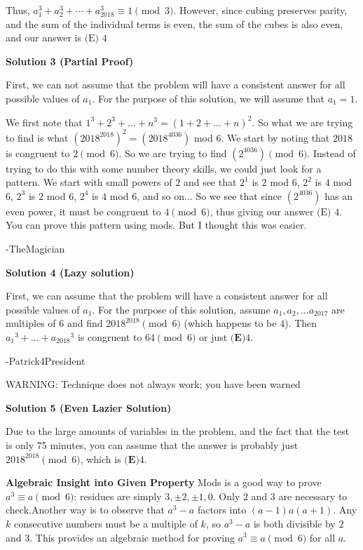 \begin{enumerate}
 Thus, $a_1^3+a_2^3+\cdots+a_{2018}^3\equiv 1\pmod 3$. However, since cubing preserves parity, and the sum of the individual terms is even, the sum of the cubes is also even, and our answer is $\boxed{\text{(E) }4}$




\textbf{Solution 3 (Partial Proof)}

First, we can not assume that the problem will have a consistent answer for all possible values of $a_1$. For the purpose of this solution, we will assume that $a_1 = 1$.

 We first note that $1^3+2^3+...+n^3 = (1+2+...+n)^2$. So what we are trying to find is what $\left(2018^{2018}\right)^2=\left(2018^{4036}\right)$ mod $6$. We start by noting that $2018$ is congruent to $2 \pmod{6}$. So we are trying to find $\left(2^{4036}\right) \pmod{6}$. Instead of trying to do this with some number theory skills, we could just look for a pattern. We start with small powers of $2$ and see that $2^1$ is $2$ mod $6$, $2^2$ is $4$ mod $6$, $2^3$ is $2$ mod $6$, $2^4$ is $4$ mod $6$, and so on... So we see that since $\left(2^{4036}\right)$ has an even power, it must be congruent to $4 \pmod{6}$, thus giving our answer $\boxed{\text{(E) }4}$. You can prove this pattern using mods. But I thought this was easier.

 -TheMagician

 



\textbf{Solution 4 (Lazy solution)}

First, we can assume that the problem will have a consistent answer for all possible values of $a_1$. For the purpose of this solution, assume $a_1, a_2, ... a_{2017}$ are multiples of 6 and find $2018^{2018} \pmod{6}$ (which happens to be $4$). Then ${a_1}^3 + ... + {a_{2018}}^3$ is congruent to $64 \pmod{6}$ or just $\boxed{\textbf{(E)}  4}$. 

 -Patrick4President

 WARNING: Technique does not always work; you have been warned

 



\textbf{Solution 5 (Even Lazier Solution)}

Due to the large amounts of variables in the problem, and the fact that the test is only 75 minutes, you can assume that the answer is probably just $2018^{2018} \pmod{6}$, which is $\boxed{\textbf{(E)}  4}$.

 \textbf{Algebraic Insight into Given Property} Mods is a good way to prove $a^3 \equiv a \pmod6$: residues are simply $3, \pm 2, \pm 1, 0$. Only $2$ and $3$ are necessary to check.Another way is to observe that $a^3-a$ factors into $(a-1)a(a+1)$. Any $k$ consecutive numbers must be a multiple of $k$, so $a^3-a$ is both divisible by $2$ and $3$. This provides an algebraic method for proving $a^3 \equiv a \pmod6$ for all $a$.


\end{enumerate}
